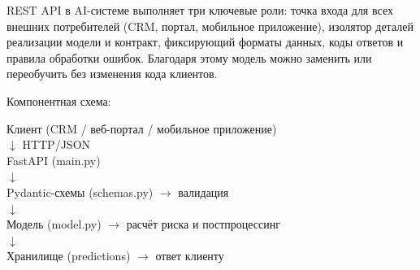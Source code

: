 \documentclass[12pt,a4paper]{article}
\begin{document}
REST API в AI-системе выполняет три ключевые роли: точка входа для всех внешних потребителей (CRM, портал, мобильное приложение), изолятор деталей реализации модели и контракт, фиксирующий форматы данных, коды ответов и правила обработки ошибок. Благодаря этому модель можно заменить или переобучить без изменения кода клиентов.

Компонентная схема:

\begin{center}
Клиент (CRM / веб-портал / мобильное приложение) \\
$\downarrow$ HTTP/JSON \\
FastAPI (main.py) \\
$\downarrow$ \\
Pydantic-схемы (schemas.py) $\rightarrow$ валидация \\
$\downarrow$ \\
Модель (model.py) $\rightarrow$ расчёт риска и постпроцессинг \\
$\downarrow$ \\
Хранилище (predictions) $\rightarrow$ ответ клиенту
\end{center}
\end{document}
